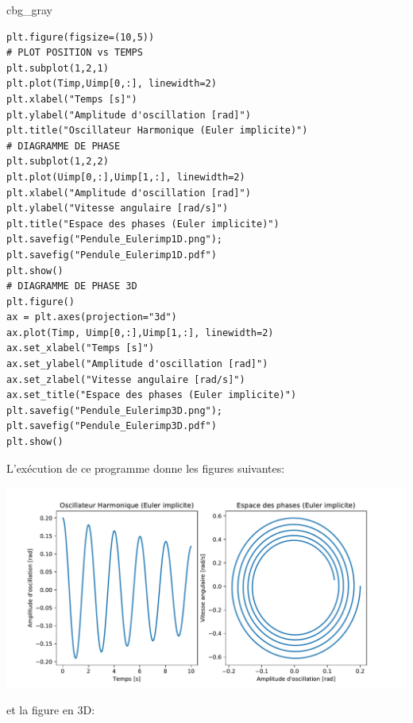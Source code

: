 \documentclass[%
oneside,                 %
final,                   %
10pt,french]{article}
\newenvironment{_cod_tight}[1]{
   \def\FrameCommand{\colorbox{#1}}
   \FrameRule0.6pt\MakeFramed {\FrameRestore}\vskip3mm}
   {\vskip0mm\endMakeFramed}
\newenvironment{cod}[1]{
\bgroup\rmfamily
\fboxsep=0mm\relax
\begin{_cod_tight}{#1}
\list{}{\parsep=-2mm\parskip=0mm\topsep=0pt\leftmargin=2mm
\rightmargin=2\leftmargin\leftmargin=4pt\relax}
\item\relax}
{\endlist\end{_cod_tight}\egroup}
\newenvironment{doconceexercise}{}{}
\begin{document}
\begin{doconceexercise}
\begin{cod}{cbg_gray}
\begin{verbatim}
plt.figure(figsize=(10,5))
# PLOT POSITION vs TEMPS
plt.subplot(1,2,1)
plt.plot(Timp,Uimp[0,:], linewidth=2)
plt.xlabel("Temps [s]")
plt.ylabel("Amplitude d'oscillation [rad]")
plt.title("Oscillateur Harmonique (Euler implicite)")
# DIAGRAMME DE PHASE
plt.subplot(1,2,2)
plt.plot(Uimp[0,:],Uimp[1,:], linewidth=2)
plt.xlabel("Amplitude d'oscillation [rad]")
plt.ylabel("Vitesse angulaire [rad/s]")
plt.title("Espace des phases (Euler implicite)")
plt.savefig("Pendule_Eulerimp1D.png"); plt.savefig("Pendule_Eulerimp1D.pdf")
plt.show()
# DIAGRAMME DE PHASE 3D
plt.figure()
ax = plt.axes(projection="3d")
ax.plot(Timp, Uimp[0,:],Uimp[1,:], linewidth=2)
ax.set_xlabel("Temps [s]")
ax.set_ylabel("Amplitude d'oscillation [rad]")
ax.set_zlabel("Vitesse angulaire [rad/s]")
ax.set_title("Espace des phases (Euler implicite)")
plt.savefig("Pendule_Eulerimp3D.png"); plt.savefig("Pendule_Eulerimp3D.pdf")
plt.show()
\end{verbatim}
\end{cod}
\noindent

L'exécution de ce programme donne les figures suivantes:



\vspace{6mm}

\centerline{\includegraphics[width=1.0\linewidth]{scripts/Pendule_Eulerimp1D.pdf}}

\vspace{6mm}



et la figure en 3D:



\vspace{6mm}


\end{doconceexercise}
\end{document}
